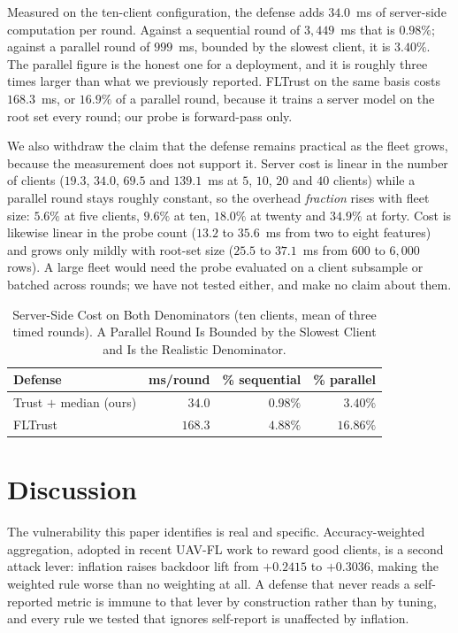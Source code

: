 \documentclass[journal]{IEEEtran}
\begin{document}
Measured on the ten-client configuration, the defense adds $34.0$~ms of server-side computation per
round. Against a sequential round of $3{,}449$~ms that is $0.98\%$; against a parallel round of
$999$~ms, bounded by the slowest client, it is $3.40\%$. The parallel figure is the honest one for a
deployment, and it is roughly three times larger than what we previously reported. FLTrust on the
same basis costs $168.3$~ms, or $16.9\%$ of a parallel round, because it trains a server model on
the root set every round; our probe is forward-pass only.

We also withdraw the claim that the defense remains practical as the fleet grows, because the
measurement does not support it. Server cost is linear in the number of clients ($19.3$, $34.0$,
$69.5$ and $139.1$~ms at $5$, $10$, $20$ and $40$ clients) while a parallel round stays roughly
constant, so the overhead \emph{fraction} rises with fleet size: $5.6\%$ at five clients, $9.6\%$ at
ten, $18.0\%$ at twenty and $34.9\%$ at forty. Cost is likewise linear in the probe count ($13.2$ to
$35.6$~ms from two to eight features) and grows only mildly with root-set size ($25.5$ to
$37.1$~ms from $600$ to $6{,}000$ rows). A large fleet would need the probe evaluated on a client
subsample or batched across rounds; we have not tested either, and make no claim about them.

\begin{table}[!t]
\renewcommand{\arraystretch}{1.25}
\caption{Server-Side Cost on Both Denominators (ten clients, mean of three timed rounds). A Parallel Round Is Bounded by the Slowest Client and Is the Realistic Denominator.}
\label{tab:cost}
\centering
\footnotesize
\setlength{\tabcolsep}{4pt}
\begin{tabular}{@{}l rrr@{}}
\toprule
\textbf{Defense} & \textbf{ms/round} & \textbf{\% sequential} & \textbf{\% parallel} \\
\midrule
Trust $+$ median (ours)       & $34.0$  & $0.98\%$ & $3.40\%$  \\
FLTrust \cite{cao2021fltrust} & $168.3$ & $4.88\%$ & $16.86\%$ \\
\bottomrule
\end{tabular}
\end{table}

\section{Discussion}
The vulnerability this paper identifies is real and specific. Accuracy-weighted aggregation, adopted in recent UAV-FL work to reward good clients, is a second attack lever: inflation raises backdoor lift from $+0.2415$ to $+0.3036$, making the weighted rule worse than no weighting at all. A defense that never reads a self-reported metric is immune to that lever by construction rather than by tuning, and every rule we tested that ignores self-report is unaffected by inflation.
\end{document}
